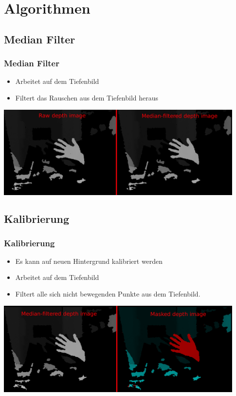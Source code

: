 \documentclass[compress]{beamer}
\begin{document}
\section{Algorithmen}

\subsection{Median Filter}
\begin{frame}
\frametitle{Median Filter}
\begin{itemize}
	\item Arbeitet auf dem Tiefenbild
	\item Filtert das Rauschen aus dem Tiefenbild heraus
\end{itemize}
\vspace*{1cm}
\includegraphics[width=12.4cm]{filter1.png}
\end{frame}

\subsection{Kalibrierung}
\begin{frame}
\frametitle{Kalibrierung}
\begin{itemize}
	\item Es kann auf neuen Hintergrund kalibriert werden
	\item Arbeitet auf dem Tiefenbild
	\item Filtert alle sich nicht bewegenden Punkte aus dem Tiefenbild.
\end{itemize}
\includegraphics[width=12.4cm]{filter2.png}
\end{frame}
\end{document}
